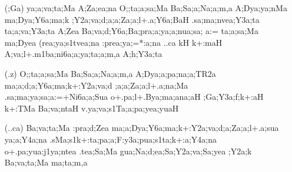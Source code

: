 \begin{spacing}{1.15}
\begin{itemize}
\begin{itemize}
            \item[({\sktf ;Ga})] {\sktf ya;a;va;ta;Ma A;Za;ea;na
O;;ta;a;sa;Ma Ba;Sa;a;Na;a;m,a A;Dya;ya;nMa ma;Dya;Y6a;ma;k
;Y2a;va;d;a;a;Za;a;l+.a;Y6a;BaH .sa;ma;nvea;Y3a;ta\ZF{,} ta;a;va;Y3a;ta A;Zea Ba;va;d;Y6a;Ba;pra;a;ya;a;nua;sa;%
a:= ta;a;sa;Ma ma;Dyea (rea;ya;s1tvea;na
:prea;ya;=*:a;na ..ca kH
k+:maH A;va;l+.m1ba;ni6a;a;ya;ta;a;m,a
A;h;Y3a;ta} 
            
   \item[({\sktf .z})] {\sktf O;;ta;a;sa;Ma Ba;Sa;a;Na;a;m,a
A;Dya;a;pa;na;a;TR2a ma;a;d;a;Y6a;ma;k+:Y2a;va;d%
;a;a;Za;a;l+.a;na;Ma .sa;ma;ya;sa;a:=+Ni6a;a;Sua o+.pa;l+.Bya;ma;ana;aH ;Ga;Y3a;f;k+:aH k+:TMa Ba;va;ntaH
v.ya;va;s1Ta;a;pa;yea;yuaH}
            
   \item[({\sktf ..ca})] {\sktf Ba;va;ta;Ma :pra;d;Zea
ma;a;Dya;Y6a;ma;k+:Y2a;va;d;a;Za;a;l+.a;sua ya;a;Y4a;na
.sMa;s1k+:ta;pa;a;F:y3a;pua;s1ta;k+:a;Y4a;na
o+.pa;yua:j1ya;ntea\ZF{,} .tea;Sa;Ma gua;Na;d;ea;Sa;Y2a;va;Sa;yea ;Y2a;k Ba;va;ta;Ma ma;ta;m,a}
            \end{itemize}
\end{itemize}
\end{spacing}

\newpage

